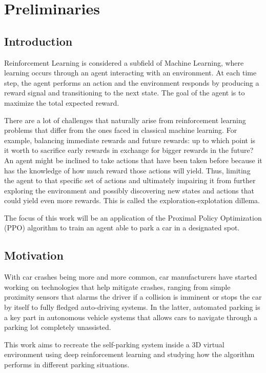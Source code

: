 \chapter{Preliminaries}
\label{cap:introducao}

\section{Introduction}

Reinforcement Learning is considered a subfield of Machine Learning, where learning occurs through an agent interacting with an environment. At each time step, the agent performs an action and the environment responds by producing a reward signal and transitioning to the next state. The goal of the agent is to maximize the total expected reward. \cite{suttonbarto}

There are a lot of challenges that naturally arise from reinforcement learning problems that differ from the ones faced in classical machine learning. For example, balancing immediate rewards and future rewards: up to which point is it worth to sacrifice early rewards in exchange for bigger rewards in the future? An agent might be inclined to take actions that have been taken before because it has the knowledge of how much reward those actions will yield. Thus, limiting the agent to that specific set of actions and ultimately impairing it from further exploring the environment and possibly discovering new states and actions that could yield even more rewards. This is called the exploration-explotation dillema. \cite{suttonbarto}


The focus of this work will be an application of the Proximal Policy Optimization (PPO) algorithm to train an agent able to park a car in a designated spot.

\section{Motivation}
With car crashes being more and more common, car manufacturers have started working on technologies that help mitigate crashes, ranging from simple proximity sensors that alarms the driver if a collision is imminent or stops the car by itself to fully fledged auto-driving systems. In the latter, automated parking is a key part in autonomous vehicle systems that allows cars to navigate through a parking lot completely unassisted.

This work aims to recreate the self-parking system inside a 3D virtual environment using deep reinforcement learning and studying how the algorithm performs in different parking situations. 